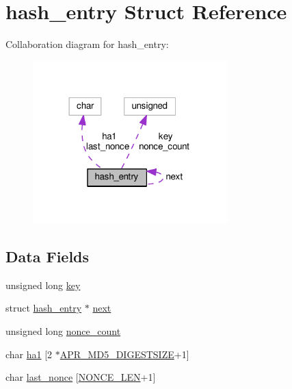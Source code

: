 \hypertarget{structhash__entry}{}\section{hash\+\_\+entry Struct Reference}
\label{structhash__entry}


Collaboration diagram for hash\+\_\+entry\+:
\nopagebreak
\begin{figure}[H]
\begin{center}
\leavevmode
\includegraphics[width=213pt]{structhash__entry__coll__graph}
\end{center}
\end{figure}
\subsection*{Data Fields}
\begin{DoxyCompactItemize}
\item 
unsigned long \hyperlink{structhash__entry_a6389e425e2e67ec704fdd863773aad65}{key}
\item 
struct \hyperlink{structhash__entry}{hash\+\_\+entry} $\ast$ \hyperlink{structhash__entry_a89d54620c14cf507f4a87d0b12721db7}{next}
\item 
unsigned long \hyperlink{structhash__entry_a27a2099565842fc981b681071e41cf39}{nonce\+\_\+count}
\item 
char \hyperlink{structhash__entry_a5b56e4a2878d2a0e4dac4746c3f39f14}{ha1} \mbox{[}2 $\ast$\hyperlink{group__APR__MD5_ga0bb65e74ccdddca6ef75e886084e52dc}{A\+P\+R\+\_\+\+M\+D5\+\_\+\+D\+I\+G\+E\+S\+T\+S\+I\+ZE}+1\mbox{]}
\item 
char \hyperlink{structhash__entry_a6b4c8e58934a456ba0849c7f52ea4b85}{last\+\_\+nonce} \mbox{[}\hyperlink{mod__auth__digest_8c_a7e8c5d122939dcb4dff3ef114d7cffdc}{N\+O\+N\+C\+E\+\_\+\+L\+EN}+1\mbox{]}
\end{DoxyCompactItemize}


